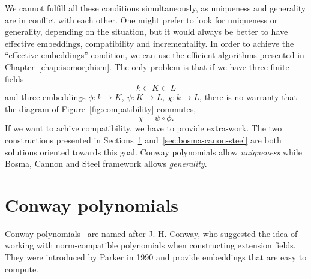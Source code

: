 We cannot fulfill all these conditions simultaneously, as
uniqueness and generality are in conflict with each other. One might prefer to
look for uniqueness or generality, depending on the situation, but it would
always be better to have effective embeddings, compatibility and incrementality.
In order to achieve the ``effective embeddings'' condition, we can use the
efficient algorithms presented in Chapter~\ref{chap:isomorphism}. The only
problem is that if we have three finite fields
\[
  k\subset K\subset L
\]
and three embeddings $\phi:k\to K$, $\psi:K\to L$, $\chi:k\to L$, there is no
warranty that the diagram of Figure~\ref{fig:compatibility} commutes, \ie
\[
  \chi = \psi\circ\phi.
\]
If we want to achive compatibility, we have to provide extra-work.
The two constructions presented in Sections~\ref{sec:conway}
and~\ref{sec:bosma-canon-steel} are both solutions oriented towards this goal.
Conway polynomials allow \emph{uniqueness} while Bosma, Cannon and Steel
framework allows \emph{generality}.

\section{Conway polynomials}
\label{sec:conway}

%

Conway polynomials~\cite{Parker90, Scheerhorn92} are named after J. H. Conway,
who suggested the idea of working with norm-compatible polynomials when
constructing extension fields. They were introduced by Parker in 1990 and
provide embeddings that are easy to compute.

